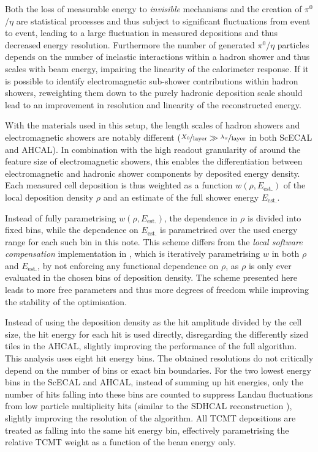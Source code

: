 \documentclass[twoside,a4paper,12pt]{article}
\begin{document}
Both the loss of measurable energy to \emph{invisible} mechanisms and the creation of $\pi^0$/$\eta$ are statistical processes and thus subject to significant fluctuations from event to event, leading to a large fluctuation in measured depositions and thus decreased energy resolution. Furthermore the number of generated $\pi^0$/$\eta$ particles depends on the number of inelastic interactions within a hadron shower and thus scales with beam energy, impairing the linearity of the calorimeter response. If it is possible to identify electromagnetic sub-shower contributions within hadron showers, reweighting them down to the purely hadronic deposition scale should lead to an improvement in resolution and linearity of the reconstructed energy.

With the materials used in this setup, the length scales of hadron showers and electromagnetic showers are notably different ($\nicefrac{X_0}{\text{layer}}\gg\nicefrac{\lambda_{\pi}}{\text{layer}}$ in both ScECAL and AHCAL). In combination with the high readout granularity of around the feature size of electromagnetic showers, this enables the differentiation between electromagnetic and hadronic shower components by deposited energy density. Each measured cell deposition is thus weighted as a function $w(\rho, E_\text{est.})$ of the local deposition density $\rho$ and an estimate of the full shower energy $E_\text{est.}$. 

Instead of fully parametrising $w(\rho, E_\text{est.})$, the dependence in $\rho$ is divided into fixed bins, while the dependence on $E_\text{est.}$ is parametrised over the used energy range for each such bin in this note. This scheme differs from the \emph{local software compensation} implementation in \cite{SCPaper}, which is iteratively parametrising $w$ in both $\rho$ and $E_\text{est.}$, by not enforcing any functional dependence on $\rho$, as $\rho$ is only ever evaluated in the chosen bins of deposition density. The scheme presented here leads to more free parameters and thus more degrees of freedom while improving the stability of the optimisation. 

Instead of using the deposition density as the hit amplitude divided by the cell size, the hit energy for each hit is used directly, disregarding the differently sized tiles in the AHCAL, slightly improving the performance of the full algorithm. This analysis uses eight hit energy bins. The obtained resolutions do not critically depend on the number of bins or exact bin boundaries. For the two lowest energy bins in the ScECAL and AHCAL, instead of summing up hit energies, only the number of hits falling into these bins are counted to suppress Landau fluctuations from low particle multiplicity hits (similar to the SDHCAL reconstruction \cite{SDHCAL}), slightly improving the resolution of the algorithm. All TCMT depositions are treated as falling into the same hit energy bin, effectively parametrising the relative TCMT weight as a function of the beam energy only.
\end{document}
